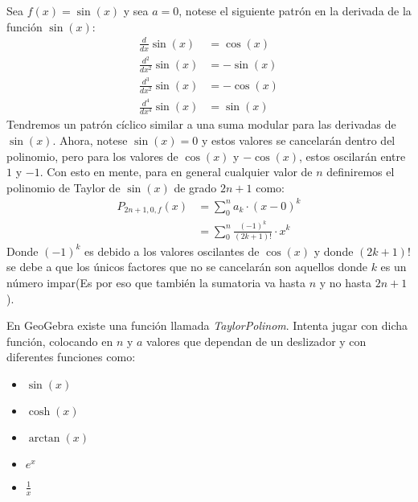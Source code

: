 \documentclass[12pt,a4paper,oneside]{memoir}
\begin{document}
\begin{example}
    Sea $f(x) = \sin(x)$ y sea $a=0$, notese el siguiente patrón en la derivada de la función $\sin(x)$:
    \begin{align*}
        \frac{d}{dx} \sin(x) &= \cos(x)\\
        \frac{d^2}{dx^2} \sin(x) &= -\sin(x)\\
        \frac{d^3}{dx^2} \sin(x) &= -\cos(x)\\
        \frac{d^4}{dx^4} \sin(x) &= \sin(x)
    \end{align*}
    Tendremos un patrón cíclico similar a una suma modular para las derivadas de $\sin(x)$. Ahora, notese $\sin(x) = 0$ y estos valores se cancelarán dentro del polinomio, pero para los valores de $\cos(x)$ y $-\cos(x)$, estos oscilarán entre $1$ y $-1$. Con esto en mente, para en general cualquier valor de $n$ definiremos el polinomio de Taylor de $\sin(x)$ de grado $2n+1$ como:
    \begin{align*}
        P_{2n+1, 0, f}(x) &= \sum_{0}^{n} a_k \cdot (x-0)^k\\
        &= \sum_{0}^{n} \frac{(-1)^{k}}{(2k+1)!} \cdot x^k
    \end{align*}
    Donde $(-1)^k$ es debido a los valores oscilantes de $\cos(x)$ y donde $(2k+1)!$ se debe a que los únicos factores que no se cancelarán son aquellos donde $k$ es un número impar(Es por eso que también la sumatoria va hasta $n$ y no hasta $2n+1$). 
\end{example}

\begin{exercise}
En GeoGebra existe una función llamada \textit{TaylorPolinom}. Intenta jugar con dicha función, colocando en $n$ y $a$ valores que dependan de un deslizador y con diferentes funciones como:
\begin{itemize}
    \item $\sin(x)$
    \item $\cosh(x)$
    \item $\arctan(x)$
    \item $e^x$
    \item $\frac{1}{x}$
\end{itemize}
\end{exercise}
\end{document}
